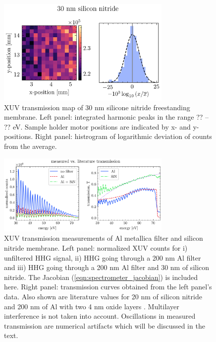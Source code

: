 \begin{figure}
	\centering
	\includegraphics[width=0.75\textwidth]{figures/chap3/nitride_map.png}
	\caption{XUV transmission map of 30 nm silicone nitride freestanding membrane. Left panel: integrated harmonic peaks in the range ?? -- ?? eV. Sample holder motor positions are indicated by x- and y-positions. Right panel: histrogram of logarithmic deviation of counts from the average.}
	\label{fig:nitride_map}
\end{figure}

\begin{figure}
	\centering
	\includegraphics[width=0.75\textwidth]{figures/chap3/SiN_Al_transmission.png}
	\caption{XUV transmission measurements of Al metallica filter and silicon nitride membrane. Left panel: normalized XUV counts for i) unfiltered HHG signal, ii) HHG going through a 200 nm Al filter and iii) HHG going through a 200 nm Al filter and 30 nm of silicon nitride. The Jacobian (\cref{eqn:spectrometer_jacobian}) is included here. Right panel: transmission curves obtained from the left panel's data. Also shown are literature values for 20 nm of silicon nitride and 200 nm of Al with two 4 nm oxide layers \cite{gulliksonCXROXRayInteractions}. Multilayer interference is not taken into account. Oscillations in measured transmission are numerical artifacts which will be discussed in the text.}
	\label{fig:SiN_Al_transmission}
\end{figure}

